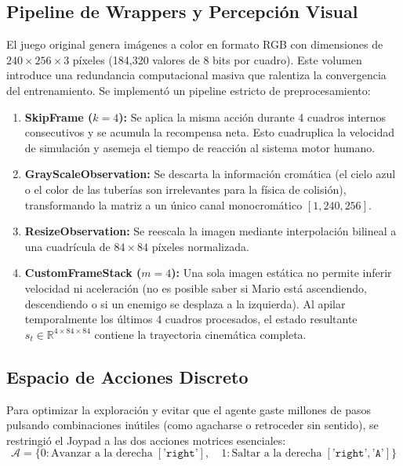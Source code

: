 \documentclass[11pt,letterpaper]{article}
\begin{document}
\subsection{Pipeline de Wrappers y Percepción Visual}
El juego original genera imágenes a color en formato RGB con dimensiones de $240 \times 256 \times 3$ píxeles (184,320 valores de 8 bits por cuadro). Este volumen introduce una redundancia computacional masiva que ralentiza la convergencia del entrenamiento. Se implementó un pipeline estricto de preprocesamiento:

\begin{enumerate}
    \item \textbf{SkipFrame ($k=4$):} Se aplica la misma acción durante 4 cuadros internos consecutivos y se acumula la recompensa neta. Esto cuadruplica la velocidad de simulación y asemeja el tiempo de reacción al sistema motor humano.
    \item \textbf{GrayScaleObservation:} Se descarta la información cromática (el cielo azul o el color de las tuberías son irrelevantes para la física de colisión), transformando la matriz a un único canal monocromático $[1, 240, 256]$.
    \item \textbf{ResizeObservation:} Se reescala la imagen mediante interpolación bilineal a una cuadrícula de $84 \times 84$ píxeles normalizada.
    \item \textbf{CustomFrameStack ($m=4$):} Una sola imagen estática no permite inferir velocidad ni aceleración (no es posible saber si Mario está ascendiendo, descendiendo o si un enemigo se desplaza a la izquierda). Al apilar temporalmente los últimos 4 cuadros procesados, el estado resultante $s_t \in \mathbb{R}^{4 \times 84 \times 84}$ contiene la trayectoria cinemática completa.
\end{enumerate}

\subsection{Espacio de Acciones Discreto}
Para optimizar la exploración y evitar que el agente gaste millones de pasos pulsando combinaciones inútiles (como agacharse o retroceder sin sentido), se restringió el Joypad a las dos acciones motrices esenciales:
\begin{equation}
    \mathcal{A} = \Big\{ 0: \text{Avanzar a la derecha} \; [\texttt{'right'}], \quad 1: \text{Saltar a la derecha} \; [\texttt{'right'}, \texttt{'A'}] \Big\}
\end{equation}
\end{document}
